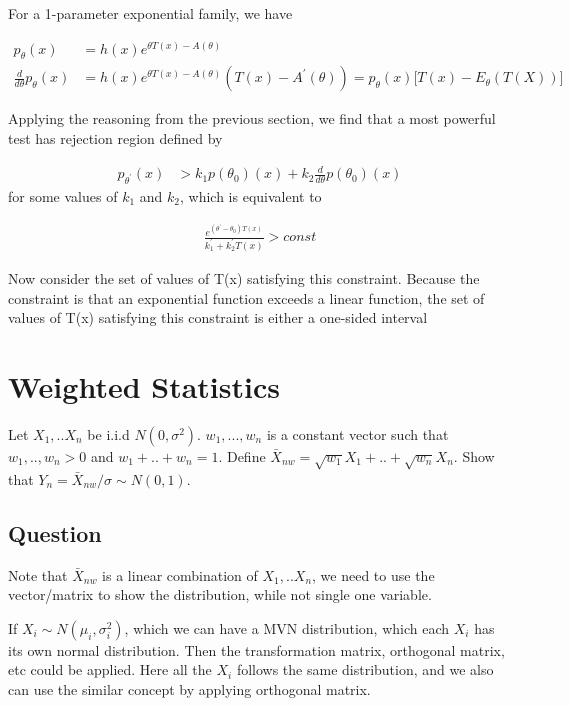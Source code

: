 \documentclass[11pt]{article} %
\begin{document}
For a 1-parameter exponential family, we have

\begin{align*}
	p_{\theta}(x) &= h(x) e^{\theta T(x) - A(\theta)} \\
	\frac{d}{d\theta} p_{\theta}(x) &= h(x) e^{\theta T(x) - A(\theta)} (T(x) - A^{'}(\theta)) = p_{\theta}(x) \Big[ T(x) - E_{\theta}(T(X)) \Big]
\end{align*}

Applying the reasoning from the previous section, we find that a most powerful test has rejection region defined by

\begin{align*}
	p_{\theta^{'}}(x) & > k_1 p(\theta_0)(x) + k_2 \frac{d}{d\theta} p(\theta_0)(x)
\end{align*}
for some values of $k_1$ and $k_2$, which is equivalent to

\begin{align*}
	\frac{e^{(\theta^{'} - \theta_0) T(x)}}{k_1^{'} + k_2^{'} T(x)} > const
\end{align*}

Now consider the set of values of T(x) satisfying this constraint. Because the constraint is that an exponential function exceeds a linear function, the set of values of T(x) satisfying
this constraint is either a one-sided interval


\section{Weighted Statistics}
Let $X_1,.. X_n$ be i.i.d $N(0, \sigma^2)$. $w_1, ..., w_n$ is a constant vector such that $w_1,.., w_n > 0$ and $w_1 + .. + w_n = 1$. Define $\bar{X}_{nw} = \sqrt{w_1} X_1 + .. + \sqrt{w_n} X_n$. Show that $Y_n = \bar{X}_{nw}/\sigma \sim N(0,1)$. 

\subsection{Question}

Note that $\bar{X}_{nw}$ is a linear combination of $X_1,.. X_n$, we need to use the vector/matrix to show the distribution, while not single one variable. 

If $X_i \sim N(\mu_i, \sigma_i^2)$, which we can have a MVN distribution, which each $X_i$ has its own normal distribution. Then the transformation matrix, orthogonal matrix, etc could be applied. Here all the $X_i$ follows the same distribution, and we also can use the similar concept by applying orthogonal matrix. 
\end{document}
